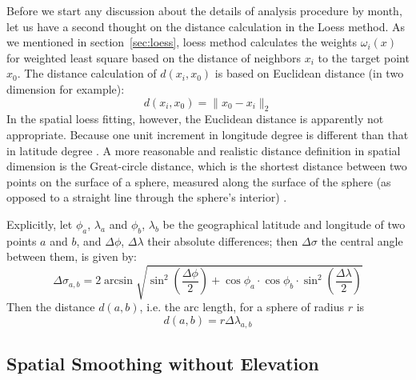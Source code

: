 Before we start any discussion about the details of analysis procedure by month,
let us have a second thought on the distance calculation in the Loess method.
As we mentioned in section~\ref{sec:loess}, loess method calculates the weights 
$\omega_i(x)$
for weighted least square based on the distance of neighbors $x_i$ to the target 
point $x_0$. The distance calculation of $d(x_i, x_0)$ is based on Euclidean distance 
(in two dimension for example):
\begin{equation} 
d(x_i, x_0) = \| x_0 - x_i \|_2
\end{equation} 
In the spatial loess fitting, however, the Euclidean distance is apparently not 
appropriate. Because one unit increment in longitude degree is different than 
that in latitude degree \cite{banerjee2005geodetic}. A more reasonable and 
realistic distance definition in spatial dimension is the Great-circle distance, 
which is the shortest distance between two points on the surface of a sphere, 
measured along the surface of the sphere (as opposed to a straight line through 
the sphere's interior) \cite{greatcircle}. 

Explicitly, let $\phi_a$, $\lambda_a$ and $\phi_b$, $\lambda_b$ be the geographical 
latitude and longitude of two points $a$ and $b$, and $\Delta \phi$, 
$\Delta \lambda$ their absolute differences; then $\Delta \sigma$ the central angle 
between them, is given by:
\begin{equation} 
\Delta \sigma_{a,b} = 2 \arcsin \sqrt{ \sin^2 ( \frac{\Delta \phi}{2} ) + \cos 
\phi_a \cdot \cos \phi_b \cdot \sin^2 ( \frac{\Delta \lambda}{2} )}
\end{equation} 
Then the distance $d(a,b)$, i.e. the arc length, for a sphere of radius $r$ is
\begin{equation} 
d(a,b) = r \Delta \lambda_{a,b}
\end{equation} 

\subsection{Spatial Smoothing without Elevation}
\label{sec:impute.w/o.elev}

